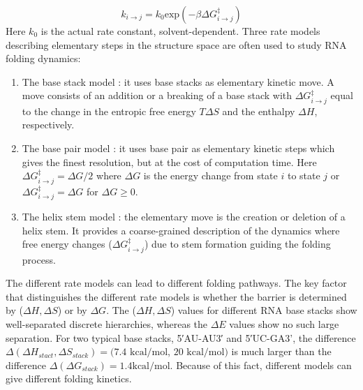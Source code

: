 \begin{equation}
\label{Eq:arrhenius}
k_{i \rightarrow j} = k_0 \text{exp}(-\beta  \Delta G^{\ddagger}_{i\rightarrow j})
\end{equation}
Here \(k_0\) is the actual rate constant, solvent-dependent. Three rate models describing elementary steps in the structure space are often used to study RNA folding dynamics: 
\begin{enumerate}
	\item The base stack model \cite{zhang02_rna_hairp_foldin_kinet,zhang2003analyzing,zhang2006exploring}: it uses base stacks as elementary kinetic move. A move consists of an addition or a breaking of a base stack with \(\Delta G^{\ddagger}_{i \rightarrow j}\) equal to the change in the entropic free energy $T\Delta S$ and the enthalpy $\Delta H$, respectively.  
	\item The base pair model \cite{flamm2000rna,cocco2003slow}: it uses base pair as elementary kinetic steps which gives the finest resolution, but at the cost of computation time. Here \(\Delta G^{\ddagger}_{i \rightarrow j}= \Delta G/2\) where $\Delta G$ is the energy change from state $i$ to state $j$ or $ \Delta G^{\ddagger}_{i \rightarrow j}= \Delta G$ for $\Delta G \geq 0$.
	\item  The helix stem model \cite{martinez84_rna_foldin_rule, isambert2000modeling}: the elementary move is the creation or deletion of a helix stem. It provides a coarse-grained description of the dynamics where free energy changes (\(\Delta G^{\ddagger}_{i \rightarrow j}\)) due to stem formation guiding the folding process. 
\end{enumerate}

The different rate models can lead to different folding pathways. The key factor that distinguishes the different rate models is whether the barrier is determined by ($\Delta H, \Delta S$) or by $\Delta G$. The  ($\Delta H, \Delta S$) values for different RNA base stacks show well-separated discrete hierarchies, whereas the $\Delta E$ values show no such large separation. For two typical base stacks, 5′AU-AU3′ and 5′UC-GA3', the difference $ \Delta (\Delta H_{stact}, \Delta S_{stack}) = (7.4 \text{ kcal/mol}$, $20 \text{ kcal/mol})$ is much larger than the difference  $\Delta (\Delta G_{stack})=1.4 \text{kcal/mol}$\cite{serra199511}. Because of this fact, different models can give different folding kinetics.

